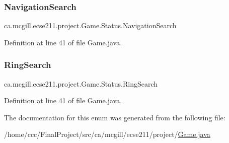 \subsubsection{\texorpdfstring{Navigation\+Search}{NavigationSearch}}
{\footnotesize\ttfamily ca.\+mcgill.\+ecse211.\+project.\+Game.\+Status.\+Navigation\+Search}



Definition at line 41 of file Game.\+java.

\mbox{\label{enumca_1_1mcgill_1_1ecse211_1_1project_1_1_game_1_1_status_a6cb7397203bf9fa47c9486ede1e8fd6d}} 
\subsubsection{\texorpdfstring{Ring\+Search}{RingSearch}}
{\footnotesize\ttfamily ca.\+mcgill.\+ecse211.\+project.\+Game.\+Status.\+Ring\+Search}



Definition at line 41 of file Game.\+java.



The documentation for this enum was generated from the following file\+:\begin{DoxyCompactItemize}
\item 
/home/ccc/\+Final\+Project/src/ca/mcgill/ecse211/project/\hyperlink{_game_8java}{Game.\+java}\end{DoxyCompactItemize}
